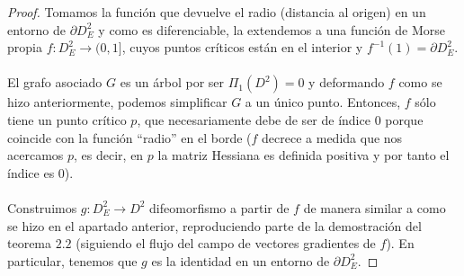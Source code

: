 \begin{proof}
	Tomamos la función que devuelve el radio (distancia al origen) en un entorno de $\partial D^2_E$ y como es diferenciable, la extendemos a una función de Morse propia $f:D^2_E \rightarrow (0,1]$, cuyos puntos críticos están en el interior y $f^{-1}(1) = \partial D^2_E$.\\
	\\ El grafo asociado $G$ es un árbol por ser $\Pi_1(D^2) = 0$ y deformando $f$ como se hizo anteriormente, podemos simplificar $G$  a un único punto. Entonces, $f$ sólo tiene un punto crítico $p$, que necesariamente debe de ser de índice $0$ porque coincide con la función ``radio'' en el borde ($f$ decrece a medida que nos acercamos $p$, es decir, en $p$ la matriz Hessiana es definida positiva y por tanto el índice es $0$).\\
	\\ Construimos $g:D^2_E \rightarrow D^2$ difeomorfismo a partir de $f$ de manera similar a como se hizo en el apartado anterior, reproduciendo parte de la demostración del teorema $2.2$ (siguiendo el flujo del campo de vectores gradientes de $f$). En particular, tenemos que $g$ es la identidad en un entorno de $\partial D^2_E$.
\end{proof}



\endinput
